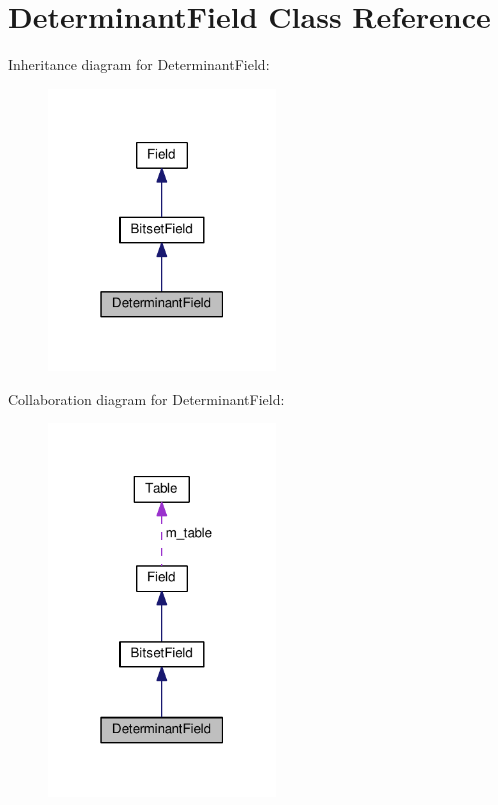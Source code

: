 \hypertarget{classDeterminantField}{}\section{Determinant\+Field Class Reference}
\label{classDeterminantField}


Inheritance diagram for Determinant\+Field\+:
\nopagebreak
\begin{figure}[H]
\begin{center}
\leavevmode
\includegraphics[width=171pt]{classDeterminantField__inherit__graph}
\end{center}
\end{figure}


Collaboration diagram for Determinant\+Field\+:
\nopagebreak
\begin{figure}[H]
\begin{center}
\leavevmode
\includegraphics[width=171pt]{classDeterminantField__coll__graph}
\end{center}
\end{figure}

